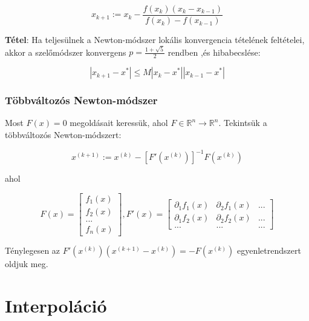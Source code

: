 \documentclass[margin=0px]{article}
\begin{document}
\begin{displaymath}
    x_{k+1} :=
    x_{k} -
    \frac
    {f(x_{k}) (x_{k} -x_{k-1}) }
    {f(x_{k}) - f(x_{k-1})}
\end{displaymath}

\noindent \textbf{Tétel}: Ha teljesülnek a Newton-módszer lokális konvergencia tételének feltételei, akkor a szelőmódszer
konvergens $p = \frac{1+\sqrt{5}}{2}$ rendben ,és hibabecslése:

\begin{displaymath}
    |x_{k+1} - x^{*}| \leq M|x_{k}-x^{*}||x_{k-1}-x^{*}|
\end{displaymath}

\subsubsection{Többváltozós Newton-módszer}

Most $F(x) = 0$ megoldásait keressük, ahol $F \in \mathbb{R}^{n} \to \mathbb{R}^{n}$. Tekintsük a többváltozós Newton-módszert:

\begin{displaymath}
    x^{(k+1)} := x^{(k)} - [F'(x^{(k)})]^{-1}F(x^{(k)})
\end{displaymath}

\noindent ahol

\begin{displaymath}
    F(x) = \begin{bmatrix}
        f_{1}(x) \\[0.3em]
        f_{2}(x) \\[0.3em]
        ...      \\[0.3em]
        f_{n}(x)
    \end{bmatrix},
    F'(x) = \begin{bmatrix}
        \partial_{1}f_{1}(x) & \partial_{2}f_{1}(x) & ... \\[0.3em]
        \partial_{1}f_{2}(x) & \partial_{2}f_{2}(x) & ... \\[0.3em]
        ...                  & ...                  & ...
    \end{bmatrix}
\end{displaymath}

\noindent Ténylegesen az $F'(x^{(k)}) (x^{(k+1)} - x^{(k)}) = -F(x^{(k)})$ egyenletrendszert oldjuk meg.

\section{Interpoláció}
\end{document}
